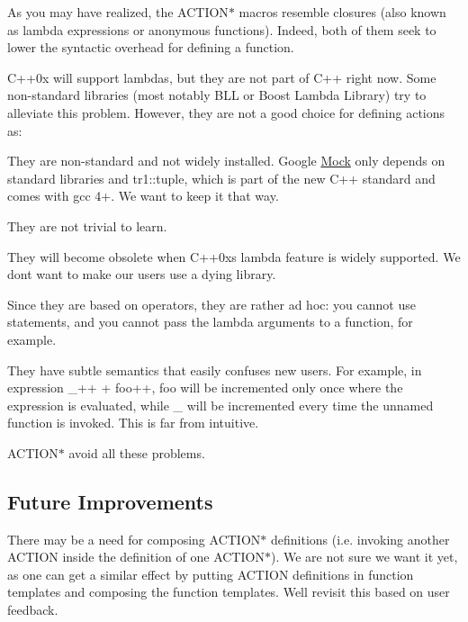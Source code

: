 As you may have realized, the {\ttfamily A\+C\+T\+I\+O\+N$\ast$} macros resemble closures (also known as lambda expressions or anonymous functions). Indeed, both of them seek to lower the syntactic overhead for defining a function.

C++0x will support lambdas, but they are not part of C++ right now. Some non-\/standard libraries (most notably B\+LL or Boost Lambda Library) try to alleviate this problem. However, they are not a good choice for defining actions as\+:


\begin{DoxyItemize}
\item They are non-\/standard and not widely installed. Google \hyperlink{classMock}{Mock} only depends on standard libraries and {\ttfamily tr1\+::tuple}, which is part of the new C++ standard and comes with gcc 4+. We want to keep it that way.
\item They are not trivial to learn.
\item They will become obsolete when C++0x\textquotesingle{}s lambda feature is widely supported. We don\textquotesingle{}t want to make our users use a dying library.
\item Since they are based on operators, they are rather ad hoc\+: you cannot use statements, and you cannot pass the lambda arguments to a function, for example.
\item They have subtle semantics that easily confuses new users. For example, in expression {\ttfamily \+\_++ + foo++}, {\ttfamily foo} will be incremented only once where the expression is evaluated, while {\ttfamily \+\_} will be incremented every time the unnamed function is invoked. This is far from intuitive.
\end{DoxyItemize}

{\ttfamily A\+C\+T\+I\+O\+N$\ast$} avoid all these problems.

\subsection*{Future Improvements}

There may be a need for composing {\ttfamily A\+C\+T\+I\+O\+N$\ast$} definitions (i.\+e. invoking another {\ttfamily A\+C\+T\+I\+ON} inside the definition of one {\ttfamily A\+C\+T\+I\+O\+N$\ast$}). We are not sure we want it yet, as one can get a similar effect by putting {\ttfamily A\+C\+T\+I\+ON} definitions in function templates and composing the function templates. We\textquotesingle{}ll revisit this based on user feedback.

